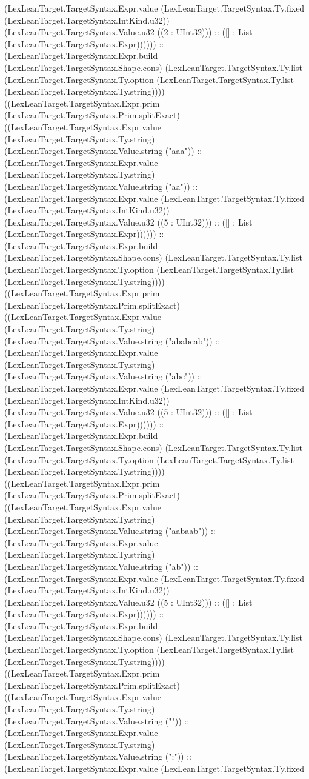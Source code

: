 \documentclass[11pt]{article}
\begin{document}
(LexLeanTarget.TargetSyntax.Expr.value (LexLeanTarget.TargetSyntax.Ty.fixed (LexLeanTarget.TargetSyntax.IntKind.u32)) (LexLeanTarget.TargetSyntax.Value.u32 ((2 : UInt32))) :: ([] : List (LexLeanTarget.TargetSyntax.Expr)))))) :: (LexLeanTarget.TargetSyntax.Expr.build (LexLeanTarget.TargetSyntax.Shape.cons) (LexLeanTarget.TargetSyntax.Ty.list (LexLeanTarget.TargetSyntax.Ty.option (LexLeanTarget.TargetSyntax.Ty.list (LexLeanTarget.TargetSyntax.Ty.string)))) ((LexLeanTarget.TargetSyntax.Expr.prim (LexLeanTarget.TargetSyntax.Prim.splitExact) ((LexLeanTarget.TargetSyntax.Expr.value (LexLeanTarget.TargetSyntax.Ty.string) (LexLeanTarget.TargetSyntax.Value.string ("aaa")) :: (LexLeanTarget.TargetSyntax.Expr.value (LexLeanTarget.TargetSyntax.Ty.string) (LexLeanTarget.TargetSyntax.Value.string ("aa")) :: (LexLeanTarget.TargetSyntax.Expr.value (LexLeanTarget.TargetSyntax.Ty.fixed (LexLeanTarget.TargetSyntax.IntKind.u32)) (LexLeanTarget.TargetSyntax.Value.u32 ((5 : UInt32))) :: ([] : List (LexLeanTarget.TargetSyntax.Expr)))))) :: (LexLeanTarget.TargetSyntax.Expr.build (LexLeanTarget.TargetSyntax.Shape.cons) (LexLeanTarget.TargetSyntax.Ty.list (LexLeanTarget.TargetSyntax.Ty.option (LexLeanTarget.TargetSyntax.Ty.list (LexLeanTarget.TargetSyntax.Ty.string)))) ((LexLeanTarget.TargetSyntax.Expr.prim (LexLeanTarget.TargetSyntax.Prim.splitExact) ((LexLeanTarget.TargetSyntax.Expr.value (LexLeanTarget.TargetSyntax.Ty.string) (LexLeanTarget.TargetSyntax.Value.string ("ababcab")) :: (LexLeanTarget.TargetSyntax.Expr.value (LexLeanTarget.TargetSyntax.Ty.string) (LexLeanTarget.TargetSyntax.Value.string ("abc")) :: (LexLeanTarget.TargetSyntax.Expr.value (LexLeanTarget.TargetSyntax.Ty.fixed (LexLeanTarget.TargetSyntax.IntKind.u32)) (LexLeanTarget.TargetSyntax.Value.u32 ((5 : UInt32))) :: ([] : List (LexLeanTarget.TargetSyntax.Expr)))))) :: (LexLeanTarget.TargetSyntax.Expr.build (LexLeanTarget.TargetSyntax.Shape.cons) (LexLeanTarget.TargetSyntax.Ty.list (LexLeanTarget.TargetSyntax.Ty.option (LexLeanTarget.TargetSyntax.Ty.list (LexLeanTarget.TargetSyntax.Ty.string)))) ((LexLeanTarget.TargetSyntax.Expr.prim (LexLeanTarget.TargetSyntax.Prim.splitExact) ((LexLeanTarget.TargetSyntax.Expr.value (LexLeanTarget.TargetSyntax.Ty.string) (LexLeanTarget.TargetSyntax.Value.string ("aabaab")) :: (LexLeanTarget.TargetSyntax.Expr.value (LexLeanTarget.TargetSyntax.Ty.string) (LexLeanTarget.TargetSyntax.Value.string ("ab")) :: (LexLeanTarget.TargetSyntax.Expr.value (LexLeanTarget.TargetSyntax.Ty.fixed (LexLeanTarget.TargetSyntax.IntKind.u32)) (LexLeanTarget.TargetSyntax.Value.u32 ((5 : UInt32))) :: ([] : List (LexLeanTarget.TargetSyntax.Expr)))))) :: (LexLeanTarget.TargetSyntax.Expr.build (LexLeanTarget.TargetSyntax.Shape.cons) (LexLeanTarget.TargetSyntax.Ty.list (LexLeanTarget.TargetSyntax.Ty.option (LexLeanTarget.TargetSyntax.Ty.list (LexLeanTarget.TargetSyntax.Ty.string)))) ((LexLeanTarget.TargetSyntax.Expr.prim (LexLeanTarget.TargetSyntax.Prim.splitExact) ((LexLeanTarget.TargetSyntax.Expr.value (LexLeanTarget.TargetSyntax.Ty.string) (LexLeanTarget.TargetSyntax.Value.string ("")) :: (LexLeanTarget.TargetSyntax.Expr.value (LexLeanTarget.TargetSyntax.Ty.string) (LexLeanTarget.TargetSyntax.Value.string (";")) :: (LexLeanTarget.TargetSyntax.Expr.value (LexLeanTarget.TargetSyntax.Ty.fixed 
\end{document}
